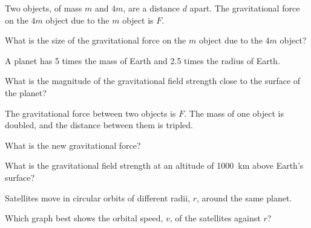 
\begin{quizq}{}
Two objects, of mass $m$ and $4m$, are a distance $d$ apart. The gravitational force on the $4m$
object due to the $m$ object is $F$.

What is the size of the gravitational force on the $m$ object due to the $4m$ object?
\end{quizq}

\begin{quizq}{}
A planet has 5 times the mass of Earth and 2.5 times the radius of Earth.

What is the magnitude of the gravitational field strength close to the surface of the planet?
\end{quizq}

\begin{quizq}{}
The gravitational force between two objects is $F$. The mass of one object is doubled, and the
distance between them is tripled.

What is the new gravitational force?
\end{quizq}

\begin{quizq}{}
What is the gravitational field strength at an altitude of \qty{1000}{km} above Earth's surface?
\end{quizq}

\begin{quizq}{}
Satellites move in circular orbits of different radii, $r$, around the same planet.

Which graph best shows the orbital speed, $v$, of the satellites against $r$?
  {%
  }
  {%
  }
  {%
  }
\end{quizq}

